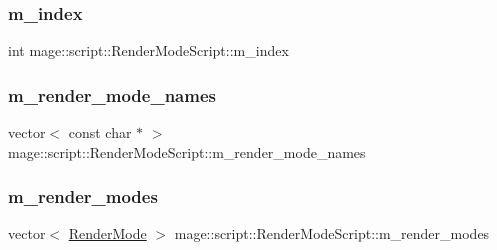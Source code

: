 \hypertarget{classmage_1_1script_1_1_render_mode_script_a7c18b69323011be23a3ff6148b519619}{}\label{classmage_1_1script_1_1_render_mode_script_a7c18b69323011be23a3ff6148b519619} 
\subsubsection{\texorpdfstring{m\+\_\+index}{m\_index}}
{\footnotesize\ttfamily int mage\+::script\+::\+Render\+Mode\+Script\+::m\+\_\+index\hspace{0.3cm}{\ttfamily [private]}}

\hypertarget{classmage_1_1script_1_1_render_mode_script_aeda57d60e45ce2e13faaf555d2b6632c}{}\label{classmage_1_1script_1_1_render_mode_script_aeda57d60e45ce2e13faaf555d2b6632c} 
\subsubsection{\texorpdfstring{m\+\_\+render\+\_\+mode\+\_\+names}{m\_render\_mode\_names}}
{\footnotesize\ttfamily vector$<$ const char $\ast$ $>$ mage\+::script\+::\+Render\+Mode\+Script\+::m\+\_\+render\+\_\+mode\+\_\+names\hspace{0.3cm}{\ttfamily [private]}}

\hypertarget{classmage_1_1script_1_1_render_mode_script_a9de517ba0df8f9b3a789660e9f77734e}{}\label{classmage_1_1script_1_1_render_mode_script_a9de517ba0df8f9b3a789660e9f77734e} 
\subsubsection{\texorpdfstring{m\+\_\+render\+\_\+modes}{m\_render\_modes}}
{\footnotesize\ttfamily vector$<$ \hyperlink{namespacemage_a5e7e18b0154373ce8fc942fe3f6b27fd}{Render\+Mode} $>$ mage\+::script\+::\+Render\+Mode\+Script\+::m\+\_\+render\+\_\+modes\hspace{0.3cm}{\ttfamily [private]}}

